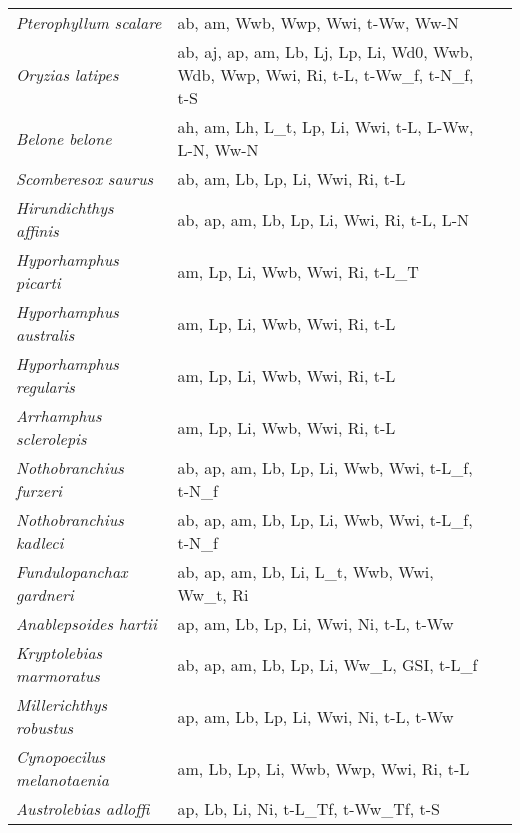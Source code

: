 {\begin{longtable}[c]{p{3.5cm}p{5.5cm}p{5.5cm}}
\emph{Pterophyllum scalare} &  ab, am, Wwb, Wwp, Wwi, t-Ww, Ww-N & \citet{KorzSzal2012,OrteCort2009,EspiFern2017} \\
\emph{Oryzias latipes} &  ab, aj, ap, am, Lb, Lj, Lp, Li, Wd0, Wwb, Wdb, Wwp, Wwi, Ri, t-L, t-Ww\_f, t-N\_f, t-S & \citet{Fabe2013,EgamEtoh1969,Iwam2004,KangYoko2002,Stan1972,MartHint1995,AnklJohn2004,GhonEgam1982,SpenHuss2006,GonzCarb2016,TehHint1998,HaseKand2016} \\
\emph{Belone belone} &  ah, am, Lh, L\_t, Lp, Li, Wwi, t-L, L-Ww, L-N, Ww-N & \citet{DulcBazd2009,ZoriSino2011,ZoriKec2013} \\
\emph{Scomberesox saurus} &  ab, am, Lb, Lp, Li, Wwi, Ri, t-L & \citet{Brow1983,AqueBrop2012} \\
\emph{Hirundichthys affinis} &  ab, ap, am, Lb, Lp, Li, Wwi, Ri, t-L, L-N & \citet{OxenHunt1994,CasaRoss2005} \\
\emph{Hyporhamphus picarti} &  am, Lp, Li, Wwb, Wwi, Ri, t-L\_T & \citet{McBrThur2003,DoriNeum2018} \\
\emph{Hyporhamphus australis} &  am, Lp, Li, Wwb, Wwi, Ri, t-L & \citet{StewHugh2007} \\
\emph{Hyporhamphus regularis} &  am, Lp, Li, Wwb, Wwi, Ri, t-L & \citet{StewHugh2007} \\
\emph{Arrhamphus sclerolepis} &  am, Lp, Li, Wwb, Wwi, Ri, t-L & \citet{StewHugh2007} \\
\emph{Nothobranchius furzeri} &  ab, ap, am, Lb, Lp, Li, Wwb, Wwi, t-L\_f, t-N\_f & \citet{BlazPola2013,BeroGarc2016} \\
\emph{Nothobranchius kadleci} &  ab, ap, am, Lb, Lp, Li, Wwb, Wwi, t-L\_f, t-N\_f & \citet{BlazPola2013,BeroGarc2016} \\
\emph{Fundulopanchax gardneri} &  ab, ap, am, Lb, Li, L\_t, Wwb, Wwi, Ww\_t, Ri & \citet{ArimOfoj2004} \\
\emph{Anablepsoides hartii} &  ap, am, Lb, Lp, Li, Wwi, Ni, t-L, t-Ww & \citet{FurnRezn2014} \\
\emph{Kryptolebias marmoratus} &  ab, ap, am, Lb, Lp, Li, Ww\_L, GSI, t-L\_f & \citet{SakaNoak2000,GargSaka2004,ParkAoki2010} \\
\emph{Millerichthys robustus} &  ap, am, Lb, Lp, Li, Wwi, Ni, t-L, t-Ww & \citet{DomiUrib2017} \\
\emph{Cynopoecilus melanotaenia} &  am, Lb, Lp, Li, Wwb, Wwp, Wwi, Ri, t-L & \citet{ArenPere2001,ArenCarv1999} \\
\emph{Austrolebias adloffi} &  ap, Lb, Li, Ni, t-L\_Tf, t-Ww\_Tf, t-S & \citet{WalfLiu1965,LiuWalf1966} \\

\end{longtable}}
